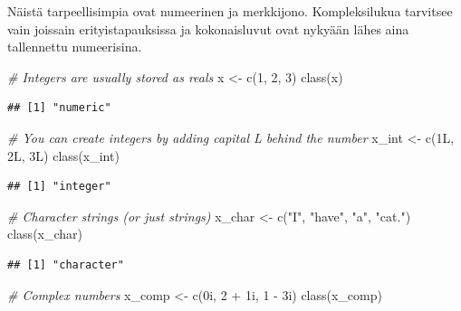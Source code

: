 \documentclass[
]{book}
\newenvironment{Shaded}{\begin{snugshade}}{\end{snugshade}}
\newcommand{\CommentTok}[1]{\textcolor[rgb]{0.56,0.35,0.01}{\textit{#1}}}
\newcommand{\DecValTok}[1]{\textcolor[rgb]{0.00,0.00,0.81}{#1}}
\newcommand{\FunctionTok}[1]{\textcolor[rgb]{0.00,0.00,0.00}{#1}}
\newcommand{\NormalTok}[1]{#1}
\newcommand{\OtherTok}[1]{\textcolor[rgb]{0.56,0.35,0.01}{#1}}
\newcommand{\SpecialCharTok}[1]{\textcolor[rgb]{0.00,0.00,0.00}{#1}}
\newcommand{\StringTok}[1]{\textcolor[rgb]{0.31,0.60,0.02}{#1}}
\begin{document}
Näistä tarpeellisimpia ovat numeerinen ja merkkijono. Kompleksilukua tarvitsee vain joissain erityistapauksissa ja kokonaisluvut ovat nykyään lähes aina tallennettu numeerisina.

\begin{Shaded}
\begin{Highlighting}[]
\CommentTok{\# Integers are usually stored as reals}
\NormalTok{x }\OtherTok{\textless{}{-}} \FunctionTok{c}\NormalTok{(}\DecValTok{1}\NormalTok{, }\DecValTok{2}\NormalTok{, }\DecValTok{3}\NormalTok{)}
\FunctionTok{class}\NormalTok{(x)}
\end{Highlighting}
\end{Shaded}

\begin{verbatim}
## [1] "numeric"
\end{verbatim}

\begin{Shaded}
\begin{Highlighting}[]
\CommentTok{\# You can create integers by adding capital L behind the number}
\NormalTok{x\_int }\OtherTok{\textless{}{-}} \FunctionTok{c}\NormalTok{(1L, 2L, 3L)}
\FunctionTok{class}\NormalTok{(x\_int)}
\end{Highlighting}
\end{Shaded}

\begin{verbatim}
## [1] "integer"
\end{verbatim}

\begin{Shaded}
\begin{Highlighting}[]
\CommentTok{\# Character strings (or just strings)}
\NormalTok{x\_char }\OtherTok{\textless{}{-}} \FunctionTok{c}\NormalTok{(}\StringTok{"I"}\NormalTok{, }\StringTok{"have"}\NormalTok{, }\StringTok{"a"}\NormalTok{, }\StringTok{"cat."}\NormalTok{)}
\FunctionTok{class}\NormalTok{(x\_char)}
\end{Highlighting}
\end{Shaded}

\begin{verbatim}
## [1] "character"
\end{verbatim}

\begin{Shaded}
\begin{Highlighting}[]
\CommentTok{\# Complex numbers}
\NormalTok{x\_comp }\OtherTok{\textless{}{-}} \FunctionTok{c}\NormalTok{(0i, }\DecValTok{2} \SpecialCharTok{+}\NormalTok{ 1i, }\DecValTok{1} \SpecialCharTok{{-}}\NormalTok{ 3i)}
\FunctionTok{class}\NormalTok{(x\_comp)}
\end{Highlighting}
\end{Shaded}
\end{document}
